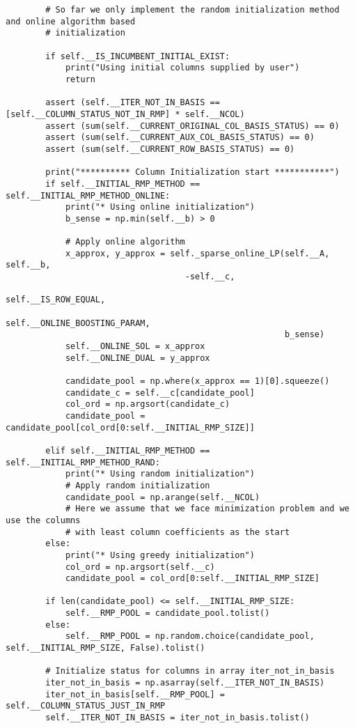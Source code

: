 \documentclass{article}
\begin{document}
\begin{lstlisting}
        # So far we only implement the random initialization method and online algorithm based
        # initialization

        if self.__IS_INCUMBENT_INITIAL_EXIST:
            print("Using initial columns supplied by user")
            return

        assert (self.__ITER_NOT_IN_BASIS == [self.__COLUMN_STATUS_NOT_IN_RMP] * self.__NCOL)
        assert (sum(self.__CURRENT_ORIGINAL_COL_BASIS_STATUS) == 0)
        assert (sum(self.__CURRENT_AUX_COL_BASIS_STATUS) == 0)
        assert (sum(self.__CURRENT_ROW_BASIS_STATUS) == 0)

        print("********** Column Initialization start ***********")
        if self.__INITIAL_RMP_METHOD == self.__INITIAL_RMP_METHOD_ONLINE:
            print("* Using online initialization")
            b_sense = np.min(self.__b) > 0

            # Apply online algorithm
            x_approx, y_approx = self._sparse_online_LP(self.__A, self.__b, 
            						-self.__c,
                                                        self.__IS_ROW_EQUAL, 
                                                        self.__ONLINE_BOOSTING_PARAM, 
                                                        b_sense)
            self.__ONLINE_SOL = x_approx
            self.__ONLINE_DUAL = y_approx

            candidate_pool = np.where(x_approx == 1)[0].squeeze()
            candidate_c = self.__c[candidate_pool]
            col_ord = np.argsort(candidate_c)
            candidate_pool = candidate_pool[col_ord[0:self.__INITIAL_RMP_SIZE]]

        elif self.__INITIAL_RMP_METHOD == self.__INITIAL_RMP_METHOD_RAND:
            print("* Using random initialization")
            # Apply random initialization
            candidate_pool = np.arange(self.__NCOL)
            # Here we assume that we face minimization problem and we use the columns
            # with least column coefficients as the start
        else:
            print("* Using greedy initialization")
            col_ord = np.argsort(self.__c)
            candidate_pool = col_ord[0:self.__INITIAL_RMP_SIZE]

        if len(candidate_pool) <= self.__INITIAL_RMP_SIZE:
            self.__RMP_POOL = candidate_pool.tolist()
        else:
            self.__RMP_POOL = np.random.choice(candidate_pool, self.__INITIAL_RMP_SIZE, False).tolist()

        # Initialize status for columns in array iter_not_in_basis
        iter_not_in_basis = np.asarray(self.__ITER_NOT_IN_BASIS)
        iter_not_in_basis[self.__RMP_POOL] = self.__COLUMN_STATUS_JUST_IN_RMP
        self.__ITER_NOT_IN_BASIS = iter_not_in_basis.tolist()


\end{lstlisting}
\end{document}
